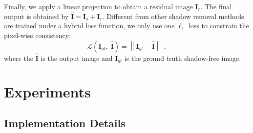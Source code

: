 \documentclass[letterpaper]{article} \usepackage{aaai23}  \usepackage{times}  \usepackage{helvet}  \usepackage{courier}  \usepackage[hyphens]{url}  \usepackage{graphicx} \urlstyle{rm} \def\UrlFont{\rm}  \usepackage{natbib}  \usepackage{caption} \frenchspacing  \setlength{\pdfpagewidth}{8.5in} \setlength{\pdfpageheight}{11in} \usepackage{algorithm}
\begin{document}
Finally, we apply a linear projection to obtain a residual image $\mathbf{I}_r$. The final output is obtained by $\hat{\mathbf{I}} = \mathbf{I}_s + \mathbf{I}_r$.
Different from other shadow removal methods~\cite{fu2021auto,chen2021canet,zhu2022efficient} are trained under a hybrid loss function, we only use one $\ell_1$ loss to constrain the pixel-wise consistency:
\begin{equation}\mathcal{L}(\mathbf{I}_{g t},\; \hat{\mathbf{I}})=\left\|\mathbf{I}_{g t}-\hat{\mathbf{I}}\right\|\;,
\end{equation}
where the $\hat{\mathbf{I}}$ is the output image and $\mathbf{I}_{gt}$ is the ground truth shadow-free image. 


\section{Experiments}
\subsection{Implementation Details}
\end{document}

